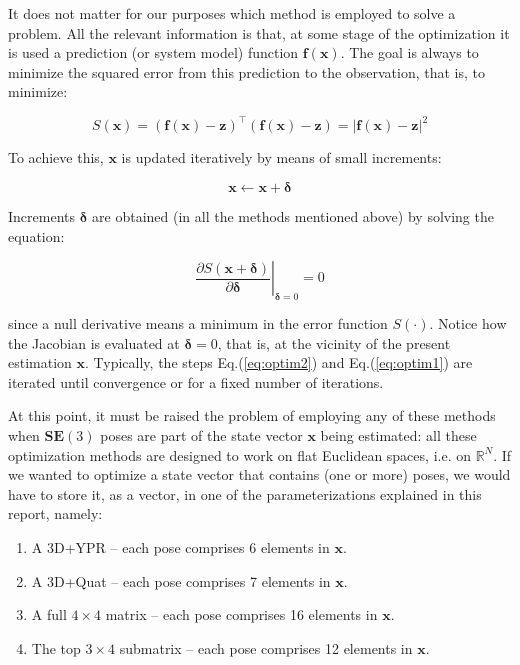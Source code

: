 \documentclass[a4paper,11pt]{report}
\newcommand{\DEL}{{\bm{\delta}}}
\begin{document}
It does not matter for our purposes which method is employed to solve a problem. 
All the relevant information is that, at some stage of the optimization 
it is used a prediction (or system model) function 
$\mathbf{f}(\mathbf{x})$. 
The goal is always to minimize the squared error from 
this prediction to the observation, that is, 
to minimize:

\begin{equation}
S(\mathbf{x}) = (\mathbf{f}(\mathbf{x})-\mathbf{z})^\top (\mathbf{f}(\mathbf{x})-\mathbf{z})
 = | \mathbf{f}(\mathbf{x})-\mathbf{z} |^2
\end{equation}

To achieve this, $\mathbf{x}$ is updated iteratively by means of small increments:

\begin{equation}
\label{eq:optim1}
 \mathbf{x}  \leftarrow \mathbf{x} + \DEL
\end{equation}

Increments $\DEL$ are obtained 
(in all the methods mentioned above) 
by solving the equation:

\begin{equation}
\label{eq:optim2}
\left. \frac{\partial S(\mathbf{x} + \DEL )}{\partial \DEL } 
\right|_{\DEL=0}
= 0
\end{equation}

\noindent since a null derivative means a minimum in the error function $S(\cdot)$.
Notice how the Jacobian is evaluated at $\DEL=0$, that is, at the vicinity of 
the present estimation $\mathbf{x}$.
Typically, the steps Eq.(\ref{eq:optim2}) and Eq.(\ref{eq:optim1}) are 
iterated until convergence or for a fixed number of iterations.

At this point, it must be raised the problem of employing any of 
these methods when $\mathbf{SE}(3)$ poses
are part of the state vector $\mathbf{x}$ being estimated: 
all these optimization methods are designed to work on flat Euclidean spaces, i.e. on $\mathbb{R}^N$.
If we wanted to optimize a state vector that contains (one or more) poses, 
we would have to store it, as a vector, in one of the parameterizations explained in this report, namely:

\begin{enumerate}
 \item A 3D+YPR -- each pose comprises 6 elements in $\mathbf{x}$.
 \item A 3D+Quat -- each pose comprises 7 elements in $\mathbf{x}$.
 \item A full $4\times 4$ matrix -- each pose comprises 16 elements in $\mathbf{x}$.
 \item The top $3\times 4$ submatrix -- each pose comprises 12 elements in $\mathbf{x}$.
\end{enumerate}
\end{document}
